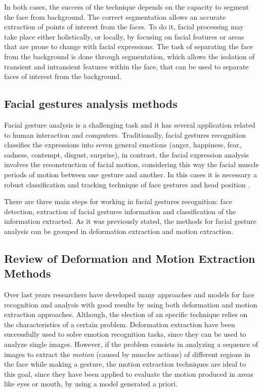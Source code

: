 In both cases, the success of the technique depends on the capacity to segment the face from background. The correct segmentation allows an accurate extraction of points of interest from the faces. To do it, facial processing may take place either holistically, or locally, by focusing on facial features or areas that are prone to change with facial expressions. The task of separating the face from the background is done through segmentation, which allows the isolation of transient and intransient features within the face, that can be used to separate faces of interest from the background.

\subsection{Facial gestures analysis methods}
Facial gesture analysis is a challenging task and it has several application related to human interaction and computers. Traditionally, facial gestures recognition classifies the expressions into seven general emotions (anger, happiness, fear, sadness, contempt, disgust, surprise), in contrast, the facial expression analysis involves the reconstruction of facial motion, considering this way the facial muscle periods of motion between one gesture and another. In this cases it is necessary a robust classification and tracking technique of face gestures and head position \cite{Cinar01}.

There are three main steps for working in facial gestures recognition: face detection, extraction of facial gestures information and classification of the information extracted. As it was previously stated, the methods for facial gesture analysis can be grouped in deformation extraction and motion extraction.

\subsection{Review of Deformation and Motion Extraction Methods}
Over last years researchers have developed many approaches and models for face recognition and analysis with good results by using both deformation and motion extraction approaches. Although, the election of an specific technique relies on the characteristics of a certain problem. Deformation extraction have been successfully used to solve emotion recognition tasks, since they can be used to analyze single images. However, if the problem consists in analyzing a sequence of images to extract the \emph{motion} (caused by muscles actions) of different regions in the face while making a gesture, the motion extraction techniques are ideal to this goal, since they have been applied to evaluate the motion produced in areas like eyes or mouth, by using a model generated a priori.

